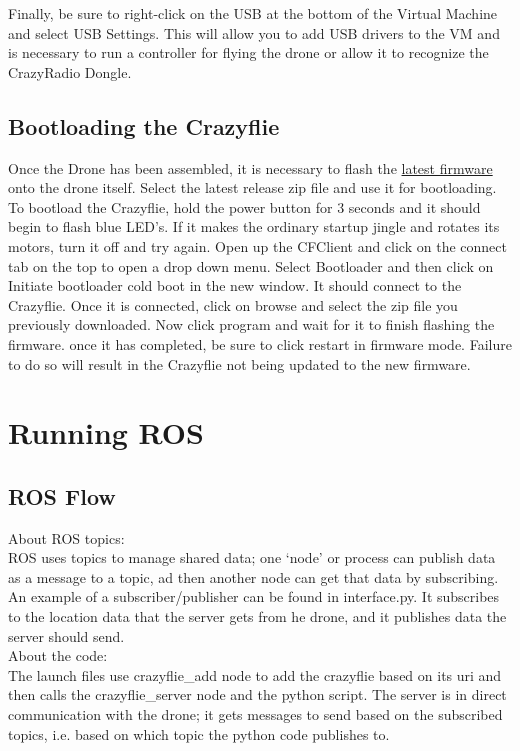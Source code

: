 \documentclass[]{article}
\begin{document}
\noindent Finally, be sure to right-click on the USB at the bottom of the Virtual Machine and select USB Settings. This will allow you to add USB drivers to the VM and is necessary to run a controller for flying the drone or allow it to recognize the CrazyRadio Dongle.

\subsection{Bootloading the Crazyflie}

\noindent Once the Drone has been assembled, it is necessary to flash the \href{https://github.com/bitcraze/crazyflie-release/releases}{latest
firmware} onto the drone itself. Select the latest release zip file and use it for bootloading. To bootload the Crazyflie, hold the power button for 3 seconds and it should begin to flash blue LED's. If it makes the ordinary startup jingle and rotates its motors, turn it off and try again. Open up the CFClient and click on the connect tab on the top to open a drop down menu. Select Bootloader and then click on Initiate bootloader cold boot in the new window. It should connect to the Crazyflie. Once it is connected, click on browse and select the zip file you previously downloaded. Now click program and wait for it to finish flashing the firmware. once it has completed, be sure to click restart in firmware mode. Failure to do so will result in the Crazyflie not being updated to the new firmware.

\section{Running ROS}

\subsection{ROS Flow}

\noindent About ROS topics: \\
\noindent ROS uses topics to manage shared data; one `node' or process can publish data as a message to a topic, ad then another node can get that data by subscribing. An example of a subscriber/publisher can be found in interface.py. It subscribes to the location data that the server gets from he drone, and it publishes data the server should send. \\

\noindent About the code: \\
\noindent The launch files use crazyflie\_add node to add the crazyflie based on its uri and then calls the crazyflie\_server node and the python script. The server is in direct communication with the drone; it gets messages to send based on the subscribed topics, i.e. based on which topic the python code publishes to.
\end{document}
